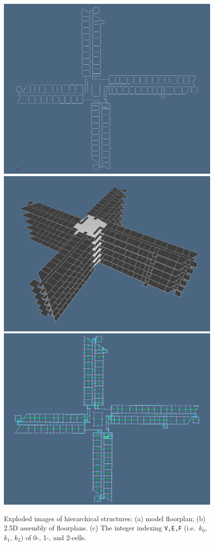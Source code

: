 \documentclass[]{egpubl}
\begin{document}
\begin{figure}[htbp] %
   \centering
   \includegraphics[width=0.469\linewidth]{images/input-png7} 
   \includegraphics[width=0.511\linewidth]{images/input-png12} 
   \includegraphics[width=\linewidth]{images/input-png5} 
   \caption{Exploded images of hierarchical structures: (a) model floorplan; (b) 2.5D assembly of floorplans. (c) The integer indexing \texttt{V,E,F} (i.e.~$k_0$, $k_1$, $k_2$) of 0-, 1-, and 2-cells.}
   \label{fig:input-png0}
\end{figure}
\end{document}
